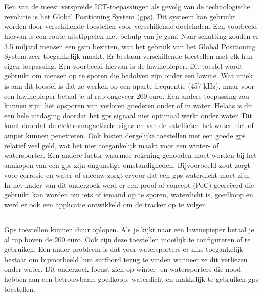 
\chapter{}
\label{ch:inleiding}
Een van de meest verspreide ICT-toepassingen als gevolg van de technologische revolutie is het Global Positioning System (gps). Dit systeem kan gebruikt worden door verschillende toestellen voor verschillende doeleinden. Een voorbeeld hiervan is een route uitstippelen met behulp van je gsm. Naar schatting zouden er 3.5 miljard mensen een gsm bezitten, wat het gebruik van het Global Positioning System zeer toegankelijk maakt. \autocite{numberOfSmartphones} Er bestaan verschillende toestellen met elk hun eigen toepassing. Een voorbeeld hiervan is de lawinepieper. Dit toestel wordt gebruikt om mensen op te sporen die bedolven zijn onder een lawine. Wat uniek is aan dit toestel is dat ze werken op een aparte frequentie (457 kHz), maar voor een lawinepieper betaal je al rap ongeveer 200 euro. \autocite{avalancheTransceivers}
Een andere toepassing zou kunnen zijn: het opsporen van verloren goederen onder of in water. Helaas is dit een hele uitdaging doordat
het gps signaal niet optimaal werkt onder water. \autocite{underwaterProblem} Dit komt doordat de elektromagnetische signalen van de satellieten het water niet of amper kunnen penetreren. Ook kosten dergelijke toestellen met een goede gps relatief veel geld, wat het niet toegankelijk maakt voor een winter- of watersporter. 
Een andere factor waarmee rekening gehouden moet worden bij het aankopen van een gps zijn ongunstige omstandigheden. Bijvoorbeeld zout zorgt voor corrosie en water of sneeuw zorgt ervoor dat een gps waterdicht moet zijn.  
In het kader van dit onderzoek werd er een proof of concept (PoC) gecreëerd die gebruikt kan worden om iets of iemand op te sporen, waterdicht is, goedkoop en werd er ook een applicatie ontwikkeld om de tracker op te volgen.


\section{}
\label{sec:probleemstelling}

Gps toestellen kunnen duur oplopen. Als je kijkt naar een lawinepieper betaal je al rap boven de 200 euro. Ook zijn deze toestellen moeilijk te configureren of te gebruiken. Een ander probleem is dat voor watersporters er niks toegankelijk bestaat om bijvoorbeeld hun surfbord terug te vinden wanneer ze dit verliezen onder water. Dit onderzoek focust zich op winter- en watersporters die nood hebben aan een betrouwbaar, goedkoop, waterdicht en makkelijk te gebruiken gps toestellen.

